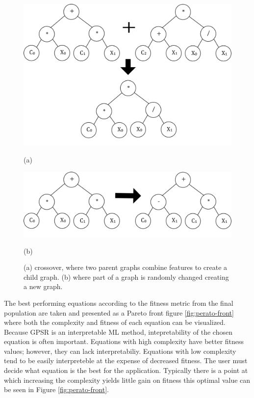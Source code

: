 \begin{figure}
    \centering

    \begin{minipage}{\textwidth}
        \centering
        \includegraphics[width=0.8\linewidth]{geometry_figures/agraph-crossover.png}
        \caption*{(a)}
    \end{minipage}
    
    \begin{minipage}{\textwidth}
        \centering
        \includegraphics[width=0.8\linewidth]{geometry_figures/agraph-mutation.png}
        \caption*{(b)}
    \end{minipage}
    
    \caption{(a) crossover, where two parent graphs combine features to create a child graph. (b) where part of a graph is randomly changed creating a new graph.}
    \label{fig:agraph_cross_mut}
\end{figure}




The best performing equations according to the fitness metric from the final population are taken and presented as a Pareto front figure \ref{fig:perato-front} where both the complexity and fitness of each equation can be visualized. Because GPSR is an interpretable ML method, intepretability of the chosen equation is often important. Equations with high complexity have better fitness values; however, they can lack interpretabiliy. Equations with low complexity tend to be easily interpreteble at the expense of decreased fitness. The user must decide what equation is the best for the application. Typically there is a point at which increasing the complexity yields little gain on fitness this optimal value can be seen in Figure \ref{fig:perato-front}. 

